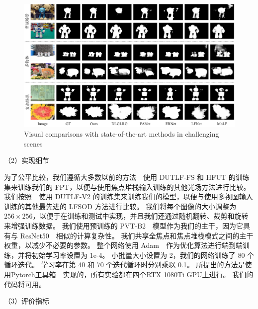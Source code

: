 \begin{figure}[!ht]
	\centering
	\includegraphics[width=\linewidth]{figures/chapter3/compare_1}
	{Visual comparisons with state-of-the-art methods in challenging scenes}
	\label{figure:figure_comparison_1}
\end{figure}






（2）实现细节



为了公平比较，我们遵循大多数以前的方法~\cite{piao2020exploit, liu2021light}~使用 DUTLF-FS 和 HFUT 的训练集来训练我们的 FPT，以便与使用焦点堆栈输入训练的其他光场方法进行比较。 我们按照~\cite{wang2022lfbcnet,jing2021occlusion}~使用 DUTLF-V2 的训练集来训练我们的模型，以便与使用多视图输入训练的其他最先进的 LFSOD 方法进行比较。 我们将每个图像的大小调整为 $256 \times 256$，以便于在训练和测试中实现，并且我们还通过随机翻转、裁剪和旋转来增强训练数据。
我们使用预训练的 PVT-B2~\cite{wang2022pvt}~模型作为我们的主干，因为它具有与 ResNet50~\cite{he2016deep}~相似的计算复杂性。 我们共享全焦点和焦点堆栈模式之间的主干权重，以减少不必要的参数。 整个网络使用 Adam~\cite{kingma2014adam}~作为优化算法进行端到端训练，并将初始学习率设置为 1e-4。 小批量大小设置为 2，我们的网络训练了 80 个循环迭代。 学习率在第 40 和 70 个迭代循环时分别乘以 0.1。 所提出的方法是使用Pytorch工具箱~\cite{paszke2017automatic}~实现的，所有实验都在四个RTX 1080Ti GPU上进行。 我们的代码将可用。 



（3）评价指标



